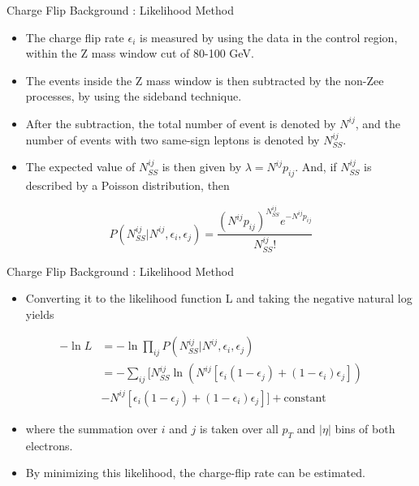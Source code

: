 \documentclass[mathserif,serif]{beamer}
\begin{document}
\begin{frame}{Charge Flip Background : Likelihood Method}
\begin{itemize}
\item The charge flip rate $\epsilon_i$ is measured by using the data in the control region, within the Z mass window cut of 80-100 GeV.
\item The events inside the Z mass window is then subtracted by the non-Zee processes, by using the sideband technique.
\item After the subtraction, the total number of event is denoted by $N^{ij}$, and the number of events with two same-sign leptons is denoted by $N^{ij}_{SS}$.
\item The expected value of $N^{ij}_{SS}$ is then given by $\lambda = N^{ij}p_{ij}$. And, if $N^{ij}_{SS}$ is described by a Poisson distribution, then
\end{itemize}
\begin{equation*}
P(N^{ij}_{SS} | N^{ij}, \epsilon_i, \epsilon_j) = \frac{(N^{ij}p_{ij})^{N^{ij}_{SS}} e^{-N^{ij}p_{ij}}}{N^{ij}_{SS}!}
\end{equation*}
\end{frame}

\begin{frame}{Charge Flip Background : Likelihood Method}
\begin{itemize}
\item Converting it to the likelihood function L and taking the negative natural log yields
\end{itemize}
\begin{equation*}
\begin{split}
-\ln L &= -\ln\prod_{ij} P(N^{ij}_{SS} | N^{ij}, \epsilon_i, \epsilon_j) \\
&= - \sum_{ij} \Big[ N^{ij}_{SS} \ln (N^{ij}[\epsilon_i (1-\epsilon_j) + (1-\epsilon_i) \epsilon_j]) \\
&- N^{ij}[\epsilon_i (1-\epsilon_j) + (1-\epsilon_i) \epsilon_j] \Big] + \text{constant}
\end{split}
\end{equation*}
\begin{itemize}
\item where the summation over $i$ and $j$ is taken over all $p_T$ and $|\eta|$ bins of both electrons.
\item By minimizing this likelihood, the charge-flip rate can be estimated.
\end{itemize}
\end{frame}
\end{document}
